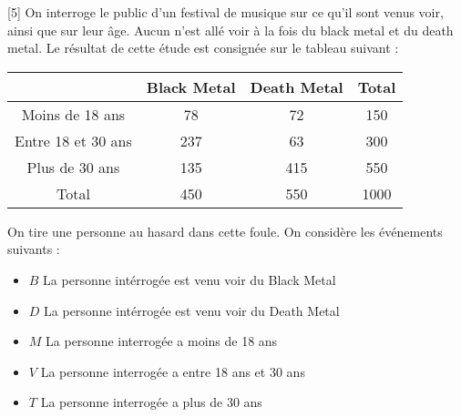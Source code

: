 \documentclass{exam}
\begin{document}
\begin{questions}
\vspace*{0.5cm}
[5]
On interroge le public d'un festival de musique sur ce qu'il sont venus voir, ainsi que sur leur âge. Aucun n'est allé voir à la fois du black metal et du death metal. Le résultat de cette étude est consignée sur le tableau suivant :
\begin{center}
\begin{tabular}{|c|c|c|c|}
\hline
& Black Metal & Death Metal & Total\\
\hline
Moins de 18 ans & 78 & 72 & 150\\
\hline
Entre 18 et 30 ans & 237 & 63 & 300\\
\hline
Plus de 30 ans & 135 & 415 & 550\\
\hline
Total & 450 & 550 & 1000\\
\hline
\end{tabular}
\end{center}
On tire une personne au hasard dans cette foule. On considère les événements suivants :
\begin{itemize}
\item $B$ \og La personne intérrogée est venu voir du Black Metal \fg
\item $D$ \og La personne intérrogée est venu voir du Death Metal \fg
\item $M$ \og La personne interrogée a moins de 18 ans \fg
\item $V$ \og La personne interrogée a entre 18 ans et 30 ans \fg
\item $T$ \og La personne interrogée a plus de 30 ans \fg
\end{itemize}
\vspace*{0.5cm}


\end{questions}
\end{document}
